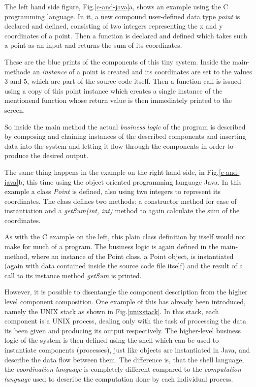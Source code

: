 The left hand side figure, Fig.\ref{c-and-java}a, shows an example
using the C programming language. In it, a new compound user-defined
data type \textit{point} is declared and defined, consisting of two
integers representing the x and y coordinates of a point.
Then a function is declared and defined which takes such a point
as an input and returns the sum of its coordinates.

These are the blue prints of the components of this tiny system.
Inside the main-methode an \textit{instance} of a point is created and
its coordinates are set to the values 3 and 5, which are part of
the source code itself. Then a function call is issued using a copy of
this point instance which creates a single instance of the mentionend
function whose return value is then immediately printed to the screen.

So inside the main method the actual \textit{business logic} of
the program is described by composing and chaining instances of the
described components and inserting data into the system and letting
it flow through the components in order to produce the desired output.
\newline

The same thing happens in the example on the right hand side, in
Fig.\ref{c-and-java}b, this time using the object oriented
programming language Java. In this example a class \textit{Point} is
defined, also using two integers to represent its coordinates.
The class defines two methods: a constructor method for ease of
instantiation and a \textit{getSum(int, int)} method to again
calculate the sum of the coordinates.

As with the C example on the left, this plain class definition
by itself would not make for much of a program. The business logic
is again defined in the main-method, where an instance of the Point
class, a Point object, is instantiated (again with data contained
inside the source code file itself) and the result of a call to
its instance method \textit{getSum} is printed.
\newline

However, it is possible to disentangle the component description
from the higher level component composition. One example of this
has already been introduced, namely the UNIX stack as shown in
Fig.\ref{unixstack}. In this stack, each component is a UNIX
process, dealing only with the task of processing the data its
been given and producing its output respectively. The higher-level
business logic of the system is then defined using the shell
which can be used to instantiate components (processes),
just like objects are instantiated in Java, and describe the data
flow between them. The difference is, that the shell language, the
\textit{coordination language} is completely
different compared to the \textit{computation language} used to
describe the computation done by each individual process.

